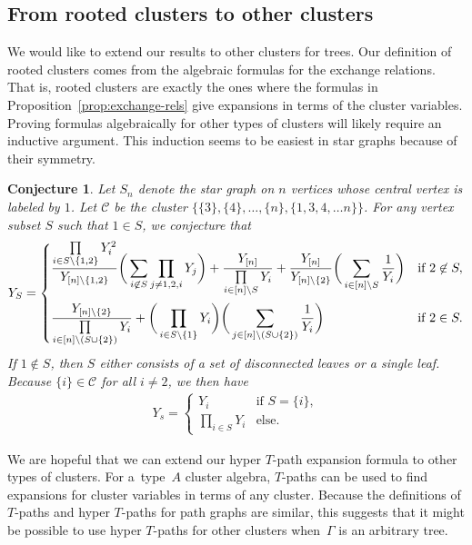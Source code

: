 \documentclass[pdftex]{sigma}
\numberwithin{equation}{section}
\newtheorem{Conjecture}[Theorem]{Conjecture}
\begin{document}
\subsection{From rooted clusters to other clusters}
We would like to extend our results to other clusters for trees.
Our definition of rooted clusters comes from the algebraic formulas for the exchange relations. That is, rooted clusters are exactly the ones where the formulas in Proposition~\ref{prop:exchange-rels} give expansions in terms of the cluster variables. Proving formulas algebraically for other types of clusters will likely require an inductive argument. This induction seems to be easiest in star graphs because of their symmetry.
\begin{Conjecture}
Let $S_n$ denote the star graph on $n$ vertices whose central vertex is labeled by $1$. Let $\mathcal{C}$ be the cluster $\{ \{3 \}, \{ 4 \}, \dots, \{ n \}, \{ 1, 3, 4, \dots n \} \}$. For any vertex subset $S$ such that $1 \in S$, we conjecture that
\begin{align*}
 Y_S = \begin{cases}
 \displaystyle\frac{\prod\limits_{i \in S \backslash \{ 1, 2 \}} Y_i^2}{Y_{[n] \backslash \{ 1, 2 \}}} \bigg( \sum\limits_{i \not\in S} \prod\limits_{j \neq 1, 2, i} Y_j \bigg) + \frac{Y_{[n]}}{\prod\limits_{i \in [n] \backslash S} Y_i} + \frac{Y_{[n]}}{Y_{[n] \backslash \{ 2 \}}} \bigg( \sum\limits_{i \in [n] \backslash S} \frac{1}{Y_i} \bigg) & \textrm{if } 2 \not\in S, \vspace{2mm}\\
 \displaystyle \frac{Y_{[n] \backslash \{ 2 \}}}{\prod\limits_{i \in [n] \backslash (S \cup \{ 2 \})} Y_i} + \bigg(\prod\limits_{i \in S \backslash \{ 1 \}} Y_i \bigg) \bigg( \sum\limits_{j \in [n] \backslash (S \cup \{ 2 \})} \frac{1}{Y_i} \bigg) & \textrm{if } 2 \in S.
 \end{cases}
\end{align*}
If $1 \not\in S$, then $S$ either consists of a set of disconnected leaves or a single leaf. Because $\{ i \} \in \mathcal{C}$ for all $i \neq 2$, we then have
\begin{align*}
 Y_s = \begin{cases}
 Y_{i} & \textrm{if }S = \{ i \}, \\
 \prod\limits_{i \in S} Y_i & \textrm{else}.
 \end{cases}
\end{align*}
\end{Conjecture}
We are hopeful that we can extend our hyper $T$-path expansion formula to other types of clusters. For a~type~$A$ cluster algebra, $T$-paths can be used to find expansions for cluster variables in terms of any cluster. Because the definitions of $T$-paths and hyper $T$-paths for path graphs are similar, this suggests that it might be possible to use hyper $T$-paths for other clusters when~$\Gamma$ is an arbitrary tree.
\end{document}
